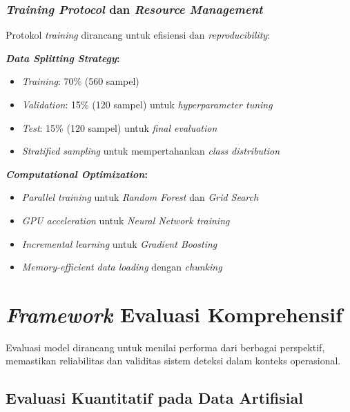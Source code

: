 \subsubsection{\textit{Training Protocol} dan \textit{Resource Management}}
\label{sec:trainingProtocol}

Protokol \textit{training} dirancang untuk efisiensi dan \textit{reproducibility}:

\textbf{\textit{Data Splitting Strategy}:}
\begin{itemize}
    \item \textit{Training}: 70\% (560 sampel)
    \item \textit{Validation}: 15\% (120 sampel) untuk \textit{hyperparameter tuning}
    \item \textit{Test}: 15\% (120 sampel) untuk \textit{final evaluation}
    \item \textit{Stratified sampling} untuk mempertahankan \textit{class distribution}
\end{itemize}

\textbf{\textit{Computational Optimization}:}
\begin{itemize}
    \item \textit{Parallel training} untuk \textit{Random Forest} dan \textit{Grid Search}
    \item \textit{GPU acceleration} untuk \textit{Neural Network training}
    \item \textit{Incremental learning} untuk \textit{Gradient Boosting}
    \item \textit{Memory-efficient data loading} dengan \textit{chunking}
\end{itemize}

\section{\textit{Framework} Evaluasi Komprehensif}
\label{sec:frameworkEvaluasi}

Evaluasi model dirancang untuk menilai performa dari berbagai perspektif, memastikan reliabilitas dan validitas sistem deteksi dalam konteks operasional.

\subsection{Evaluasi Kuantitatif pada Data Artifisial}
\label{sec:evaluasiKuantitatif}

